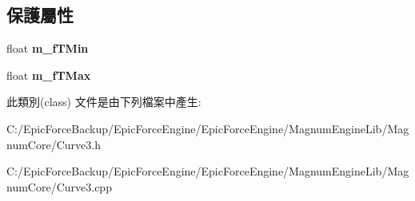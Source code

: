 \subsection*{保護屬性}
\begin{DoxyCompactItemize}
\item 
float {\bfseries m\+\_\+f\+T\+Min}\hypertarget{class_magnum_1_1_curve3_a3f803f6838b8237d42351f9f4d5d3302}{}\label{class_magnum_1_1_curve3_a3f803f6838b8237d42351f9f4d5d3302}

\item 
float {\bfseries m\+\_\+f\+T\+Max}\hypertarget{class_magnum_1_1_curve3_a7e475e6007e8738eb1c7a4262ee54701}{}\label{class_magnum_1_1_curve3_a7e475e6007e8738eb1c7a4262ee54701}

\end{DoxyCompactItemize}


此類別(class) 文件是由下列檔案中產生\+:\begin{DoxyCompactItemize}
\item 
C\+:/\+Epic\+Force\+Backup/\+Epic\+Force\+Engine/\+Epic\+Force\+Engine/\+Magnum\+Engine\+Lib/\+Magnum\+Core/Curve3.\+h\item 
C\+:/\+Epic\+Force\+Backup/\+Epic\+Force\+Engine/\+Epic\+Force\+Engine/\+Magnum\+Engine\+Lib/\+Magnum\+Core/Curve3.\+cpp\end{DoxyCompactItemize}
